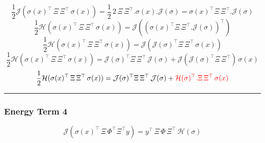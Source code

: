 \documentclass[11pt]{article}
\theoremstyle{definition}
\begin{document}
\begin{dmath}
	\frac{1}{2} \mathcal{J}(\sigma(x)^\top \, \Xi \, \Xi^\top \, \sigma(x)) = \frac{1}{2} \, 2 \, \Xi \, \Xi^\top . \sigma(x) . \mathcal{J}(\sigma) = \sigma(x)^\top \Xi \, \Xi^\top . \mathcal{J}(\sigma)
\end{dmath}
%
\begin{dmath}
	\frac{1}{2} \mathcal{H}(\sigma(x)^\top \, \Xi \, \Xi^\top \, \sigma(x)) = \mathcal{J}((\sigma(x)^\top \Xi \, \Xi^\top . \mathcal{J}(\sigma))^\top)
\end{dmath}
%
\begin{dmath}
	\frac{1}{2} \mathcal{H}(\sigma(x)^\top \, \Xi \, \Xi^\top \, \sigma(x)) = \mathcal{J}(\mathcal{J}(\sigma)^\top \Xi \, \Xi^\top \, \sigma(x))
\end{dmath}
%
\begin{dmath}
	\frac{1}{2} \mathcal{H}(\sigma(x)^\top \, \Xi \, \Xi^\top \, \sigma(x)) = \mathcal{J}(\sigma)^\top \Xi \, \Xi^\top \, \mathcal{J}(\sigma) + \mathcal{J}(\mathcal{J}(\sigma)^\top \Xi \, \Xi^\top) \, \sigma(x)
\end{dmath}
%
\begin{dmath}
	\frac{1}{2} \mathcal{H}(\sigma(x)^\top \, \Xi \, \Xi^\top \, \sigma(x)) = \mathcal{J}(\sigma)^\top \Xi \, \Xi^\top \, \mathcal{J}(\sigma) + \textcolor{red}{\mathcal{H}(\sigma)^\top . \Xi \, \Xi^\top \, \sigma(x)}
\end{dmath}
%
\noindent\rule{8cm}{0.4pt} %

\subsubsection*{Energy Term 4}

\begin{dmath}
    \mathcal{J}(\sigma(x)^\top \, \Xi \, \Phi^\top \Xi^\top y) = y^\top \, \Xi \, \Phi \, \Xi^\top \, \mathcal{H}(\sigma)
\end{dmath}
\end{document}
